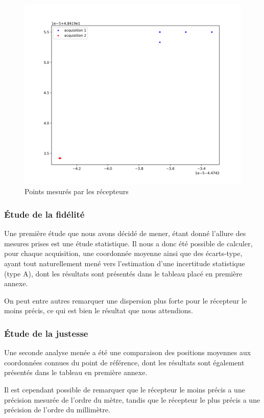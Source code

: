       \begin{figure}[h]
          \centering
          \includegraphics[width=.8\textwidth]{imgs/fidélité}
          \caption{Points mesurés par les récepteurs}
          \label{fig:fidel}
      \end{figure}

      \subsubsection{Étude de la fidélité}
         Une première étude que nous avons décidé de mener, étant donné l'allure des mesures prises est une étude statistique.
         Il nous a donc été possible de calculer, pour chaque acquisition, une coordonnée moyenne ainsi que des écarts-type, ayant tout naturellement mené vers l'estimation d'une incertitude statistique (type A), dont les résultats sont présentés dans le tableau placé en première annexe.

         On peut entre autres remarquer une dispersion plus forte pour le récepteur le moins précis, ce qui est bien le résultat que nous attendions.

      \subsubsection{Étude de la justesse}
         Une seconde analyse menée a été une comparaison des positions moyennes aux coordonnées connues du point de référence, dont les résultats sont également présentés dans le tableau en première annexe.

         Il est cependant possible de remarquer que le récepteur le moins précis a une précision mesurée de l'ordre du mètre, tandis que le récepteur le plus précis a une précision de l'ordre du millimètre.

